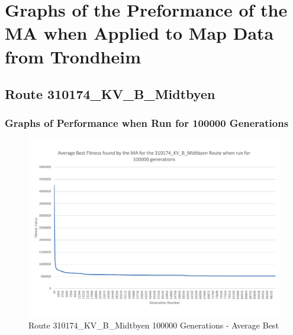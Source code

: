 







\chapter{Graphs of the Preformance of the MA when Applied to Map Data from Trondheim} %
\label{cha:gotpotmwatmdft}

\section{Route 310174\_KV\_B\_Midtbyen} %
\label{sec:route_310174_KV_B_Midtbyen}

\subsection{Graphs of Performance when Run for 100000 Generations} %
\label{sub:graphs_of_performance_when_run_for_100000_generations_KV_B}

\begin{landscape}
\begin{figure}[thbp]
	\centerline{\includegraphics[height=0.945\textwidth]{figures/Trondheim_graphs/KV_B/KV_B-100k_average_best.pdf}}
	\caption{Route 310174\_KV\_B\_Midtbyen 100000 Generations - Average Best}
	\label{fig:KV_B_100k_ab}
\end{figure}
\end{landscape}

